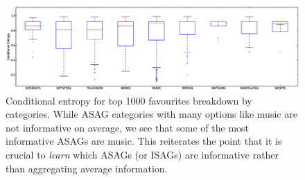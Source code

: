 \begin{figure}[tbp!]
\hspace{-12mm}\includegraphics[width=200mm]{data/plots/boxPlots/CEvsFavTypes.eps}
\vspace{-7mm}
\caption{Conditional entropy for top 1000 favourites breakdown by categories.  While ASAG categories
with many options like music are not informative on average, we see
that some of the most informative ASAGs are music.  This reiterates
the point that it is crucial to \emph{learn} which ASAGs (or ISAGs)
are informative rather than aggregating average information.}
\label{Fig5}
\end{figure}
